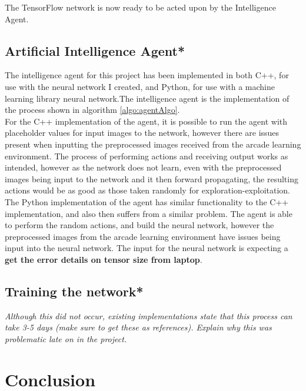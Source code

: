 \documentclass[10pt]{article}
\begin{document}
		The TensorFlow network is now ready to be acted upon by the Intelligence Agent.
		
	\medskip
	
	\subsection{Artificial Intelligence Agent*}
		The intelligence agent for this project has been implemented in both C++, for use with the neural network I created, and Python, for use with a machine learning library neural network.The intelligence agent is the implementation of the process shown in algorithm \ref{algo:agentAlgo}.\\
		
		For the C++ implementation of the agent, it is possible to run the agent with placeholder values for input images to the network, however there are issues present when inputting the preprocessed images received from the arcade learning environment. The process of performing actions and receiving output works as intended, however as the network does not learn, even with the preprocessed images being input to the network and it then forward propagating, the resulting actions would be as good as those taken randomly for exploration-exploitation.\\
		
		The Python implementation of the agent has similar functionality to the C++ implementation, and also then suffers from a similar problem. The agent is able to perform the random actions, and build the neural network, however the preprocessed images from the arcade learning environment have issues being input into the neural network. The input for the neural network is expecting a \textbf{get the error details on tensor size from laptop}.
	\medskip	
	
	
	\subsection{Training the network*}
		\textit{Although this did not occur, existing implementations state that this process can take 3-5 days (make sure to get these as references). Explain why this was problematic late on in the project.}

	\bigskip
	
\section{Conclusion}
\end{document}
